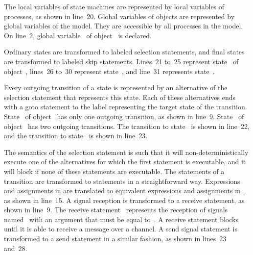 The local variables of state machines are represented by local variables of processes, as shown in line~20.
Global variables of \SLCO objects are represented by global variables of the \Promela model.
They are accessible by all processes in the model.
On line~2, global variable~ of object~ is declared.

Ordinary states are transformed to labeled selection statements, and final states are transformed to labeled skip statements.
Lines~21 to~25 represent state~ of object~, lines~26 to~30 represent state~, and line~31 represents state~.

Every outgoing transition of a state is represented by an alternative of the selection statement that represents this state.
Each of these alternatives ends with a goto statement to the label representing the target state of the transition.
State~ of object~ has only one outgoing transition, as shown in line~9.
State~ of object~ has two outgoing transitions.
The transition to state~ is shown in line~22, and the transition to state~ is shown in line~23.

The semantics of the selection statement is such that it will non-deterministically execute one of the alternatives for which the first statement is executable, and it will block if none of these statements are executable.
The statements of a transition are transformed to \Promela statements in a straightforward way.
Expressions and assignments in \SLCO are translated to equivalent expressions and assignments in \Promela, as shown in line~15.
A signal reception is transformed to a receive statement, as shown in line~9.
The receive statement~ represents the reception of signals named~ with an argument that must be equal to~\SLCOFalse.
A \Promela receive statement blocks until it is able to receive a message over a channel.
A send signal statement is transformed to a send statement in a similar fashion, as shown in lines~23 and~28. 